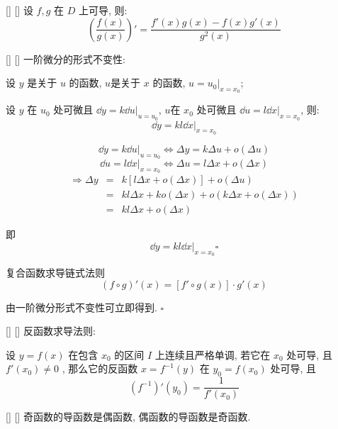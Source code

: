 \documentclass[UTF8]{ctexart}
\begin{document}
			\begin{ppt}
			    []
			    {}
			    []
			    []
				设 \(f,g\) 在 \(D\) 上可导, 则: 
				\[(\frac{f(x)}{g(x)})'=\frac{f'(x)g(x)-f(x)g'(x)}{g^2(x)}\]
			\end{ppt}
			
			\begin{ppt}
			    []
			    {}
			    []
			    []
				一阶微分的形式不变性: 
				
				设 \(y\) 是关于 \(u\) 的函数, \(u\)是关于 \(x\) 的函数, \(u=u_0|_{x=x_0}\); 
				
				设 \(y\) 在 \(u_0\) 处可微且 \(\dd y=k\dd u|_{u=u_0}\), \(u\)在 \(x_0\) 处可微且 \(\dd u=l\dd x|_{x=x_0}\), 则: 
				\[\dd y=kl\dd x|_{x=x_0}\]
			\end{ppt}

            \begin{prf} 
				\[\dd y=k\dd u|_{u=u_0}\iff\Delta y=k\Delta u+o(\Delta u)\]
				\[\dd u=l\dd x|_{x=x_0}\iff\Delta u=l\Delta x+o(\Delta x)\]
				\[\begin{array}{rcl}\Longrightarrow\Delta y & = & k[l\Delta x+o(\Delta x)]+o(\Delta u)\\
				 & = & kl\Delta x+ko(\Delta x)+o(k\Delta x+o(\Delta x))\\
				 & = & kl\Delta x+o(\Delta x)
				 \end{array}\]
				
				即\[\dd y=kl\dd x|_{x=x_0}\square\]
			\end{prf}
				
			
			\begin{ppt}
				{复合函数求导链式法则}
				\[(f\circ g)'(x)=[f'\circ g(x)]\cdot g'(x)\]
			\end{ppt}
			
            \begin{prf} 			
				由一阶微分形式不变性可立即得到. \(\square\)
			\end{prf}
    
			\begin{ppt}
			    []
			    {}
			    []
			    []
				反函数求导法则: 

                设  \( y = f(x) \)  在包含  \( x_0 \)  的区间  \( I \)  上连续且严格单调, 若它在  \( x_0 \)  处可导, 且  \( f'(x_0) \neq 0 \) , 那么它的反函数  \( x = f^{-1}(y) \)  在  \( y_0 = f(x_0) \)  处可导, 且
                \[\left( f^{-1} \right)'(y_0) = \frac{1}{f'(x_0)}\]
			\end{ppt}
			
			\begin{ppt}
			    []
			    {}
			    []
			    []
				奇函数的导函数是偶函数, 偶函数的导函数是奇函数. 
			\end{ppt}
				
\end{document}
